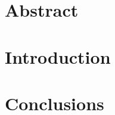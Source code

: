 \documentclass[12pt,a4paper]{report}
\begin{document}


\maketitle
\tableofcontents

\chapter{Abstract}


\chapter{Introduction}










\chapter{Conclusions}


\printglossaries



\end{document}
